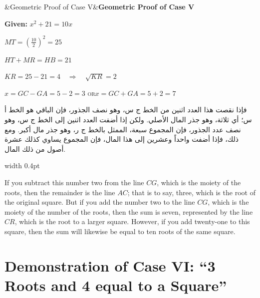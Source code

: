 \documentclass[11pt,a4paper,openany,oneside]{book}
\newenvironment{mathbox}[1][]{%
  \smallskip\par\noindent
  \begin{lrbox}{\mathboxsave}
  \begin{minipage}{\dimexpr\linewidth-2\fboxsep-2\fboxrule\relax}%
  \setlength{\parskip}{0.3em}%
  \ifx&#1&\else\textbf{#1}\\[0.2cm]\fi
}{%
  \end{minipage}%
  \end{lrbox}
  \fcolorbox{sectioncolor}{mathbg}{\usebox{\mathboxsave}}%
  \smallskip}
\begin{document}
\vspace{0.3cm}

\begin{mathbox}[Geometric Proof of Case V]
\begin{center}
\textbf{Given:} $x^2 + 21 = 10x$

\vspace{0.2cm}

$MT = \left(\frac{10}{2}\right)^2 = 25$

$HT + MR = HB = 21$

$KR = 25 - 21 = 4 \quad\Rightarrow\quad \sqrt{KR} = 2$

\vspace{0.2cm}

$x = GC - GA = 5 - 2 = 3$ \quad\textsc{or}\quad $x = GC + GA = 5 + 2 = 7$
\end{center}
\end{mathbox}

\noindent\begin{minipage}[t]{0.48\textwidth}
\raggedleft

\begin{Arabic}
فإذا نقصت هذا العدد اثنين من الخط ج س، وهو نصف الجذور، فإن الباقي هو الخط أ س؛ أي ثلاثة، وهو جذر المال الأصلي. ولكن إذا أضفت العدد اثنين إلى الخط ج س، وهو نصف عدد الجذور، فإن المجموع سبعة، الممثل بالخط ج ر، وهو جذر مال أكبر. ومع ذلك، فإذا أضفت واحداً وعشرين إلى هذا المال، فإن المجموع يساوي كذلك عشرة أصول من ذلك المال.
\end{Arabic}

\end{minipage}%
\hfill\vrule width 0.4pt\hfill
\begin{minipage}[t]{0.48\textwidth}
\raggedright

If you subtract this number two from the line $CG$, which is the moiety of the roots, then the remainder is the line $AC$; that is to say, three, which is the root of the original square. But if you add the number two to the line $CG$, which is the moiety of the number of the roots, then the sum is seven, represented by the line $CR$, which is the root to a larger square. However, if you add twenty-one to this square, then the sum will likewise be equal to ten roots of the same square.

\end{minipage}
\vspace{0.3cm}

\newpage

\section*{Demonstration of Case VI: ``3 Roots and 4 equal to a Square''}
\end{document}
